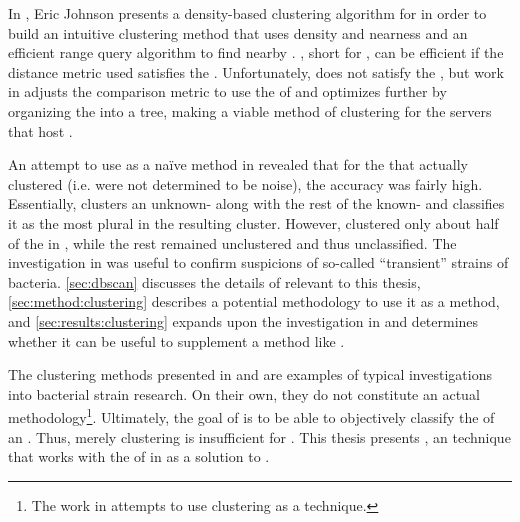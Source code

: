 In \cite{johnson2015density}, Eric Johnson presents a density-based clustering algorithm for \pyros{} in order to build an intuitive clustering method that uses density and nearness and an efficient range query algorithm to find nearby \isols{}.
\dbscan{} \cite{ester1996density}, short for \dbscanlong{}, can be efficient if the distance metric used satisfies the \trieq{}.
Unfortunately, \pearson{} does not satisfy the \trieq{}, but work in \cite{johnson2015density} adjusts the comparison metric to use the \euclid{} of \zscores{} and optimizes further by organizing the \pyros{} into a tree, making \dbscan{} a viable method of clustering for the servers that host \cplop{}.

An attempt to use \cite{johnson2015density} as a na{\"i}ve \mst{} method in \cite{DBLP:conf/bcb/McGovernJDBKV16} revealed that for the \isols{} that actually clustered (i.e. were not determined to be noise), the accuracy was fairly high.
Essentially, \cite{DBLP:conf/bcb/McGovernJDBKV16} clusters an unknown-\spec{} \isol{} along with the rest of the known-\spec{} \isols{} \cplop{} and classifies it as the most plural \spec{} in the resulting cluster.
However, \cite{johnson2015density} clustered only about half of the \isols{} in \cplop{}, while the rest remained unclustered and thus unclassified.
The investigation in \cite{DBLP:conf/bcb/McGovernJDBKV16} was useful to confirm suspicions of so-called ``transient'' strains of \ecoli{} bacteria.
\autoref{sec:dbscan} discusses the details of \cite{johnson2015density} relevant to this thesis, \autoref{sec:method:clustering} describes a potential methodology to use it as a \mst{} method, and \autoref{sec:results:clustering} expands upon the investigation in \cite{DBLP:conf/bcb/McGovernJDBKV16} and determines whether it can be useful to supplement a \mst{} method like \krap{}.

The clustering methods presented in \cite{DBLP:conf/bibm/MontanaDNBK11, montana2012investigating, SolimanDVMBNWKG12, montana2013ontological, montana2013algorithms} and \cite{johnson2015density} are examples of typical investigations into bacterial strain research.
On their own, they do not constitute an actual \mst{} methodology\footnote{The work in \cite{DBLP:conf/bcb/McGovernJDBKV16} attempts to use clustering as a \mst{} technique.}.
Ultimately, the goal of \cplop{} is to be able to objectively classify the \spec{} of an \ecoli{} \isol{}.
Thus, merely clustering \isols{} is insufficient for \mst{}.
This thesis presents \krap{}, an \mst{} technique that works with the \pyros{} of \isols{} in \cplop{} as a solution to \mst{}.

